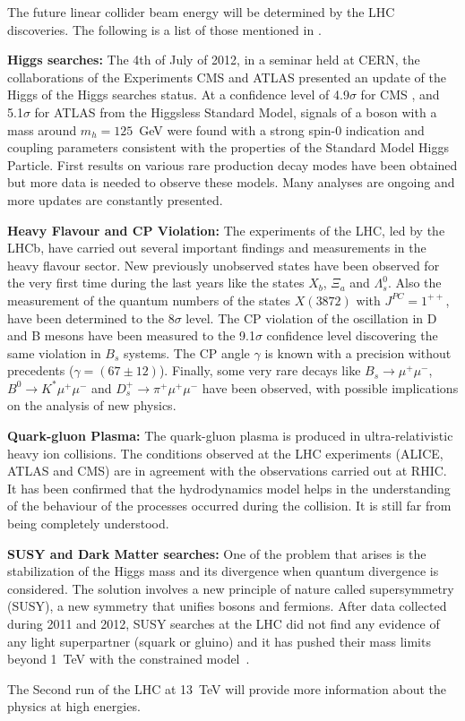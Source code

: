 The future linear collider beam energy will be determined by the LHC discoveries. The following is a list of those mentioned in \cite{GarciaMorales:1982827}.\par
\textbf{Higgs searches:} The 4th of July of 2012, in a seminar held at CERN, the collaborations of the Experiments CMS and ATLAS presented an update of the Higgs of the Higgs searches status. At a confidence level of 4.9$\sigma$ for CMS \cite{TheCMSCollaboration21122012}, and 5.1$\sigma$ for ATLAS \cite{TheATLASCollaboration21122012} from the Higgsless Standard Model, signals of a boson with a mass around $m_h=125$~GeV were found with a strong spin-0 indication and coupling parameters consistent with the properties of the Standard Model Higgs Particle. First results on various rare production decay modes have been obtained but more data is needed to observe these models. Many analyses are ongoing and more updates are constantly presented.\par
\textbf{Heavy Flavour and CP Violation:} The experiments of the LHC, led by the LHCb, have carried out several important findings and measurements in the heavy flavour sector. New previously unobserved states have been observed for the very first time during the last years like the states $X_b$, $\Xi_a$ and $\Lambda_s^0$. Also the measurement of the quantum numbers of the states $X(3872)$ with $J^{PC}=1^{++}$, have been determined to the 8$\sigma$ level. The CP violation of the oscillation in D and B mesons have been measured to the 9.1$\sigma$ confidence level discovering the same violation in $B_s$ systems. The CP angle $\gamma$ is known with a precision without precedents ($\gamma=(67\pm12)$\textdegree). Finally, some very rare decays like $B_s\rightarrow\mu^+\mu^-$, $B^0\rightarrow K^*\mu^+\mu^-$ and $D_s^+\rightarrow\pi^+\mu^+\mu^-$ have been observed, with possible implications on the analysis of new physics.\par
\textbf{Quark-gluon Plasma:} The quark-gluon plasma is produced in ultra-relativistic heavy ion collisions. The conditions observed at the LHC experiments (ALICE, ATLAS and CMS) are in agreement with the observations carried out at RHIC. It has been confirmed that the hydrodynamics model helps in the understanding of the behaviour of the processes occurred during the collision. It is still far from being completely understood.\par
\textbf{SUSY and Dark Matter searches:} One of the problem that arises is the stabilization of the Higgs mass and its divergence when quantum divergence is considered. The solution involves a new principle of nature called supersymmetry (SUSY), a new symmetry that unifies bosons and fermions. After data collected during 2011 and 2012, SUSY searches at the LHC did not find any evidence of any light superpartner (squark or gluino) and it has pushed their mass limits beyond 1~TeV with the constrained model~\cite{Kraml:2012er}.\par
\vspace*{0.6cm}
The Second run of the LHC at 13~TeV will provide more information about the physics at high energies.\par

